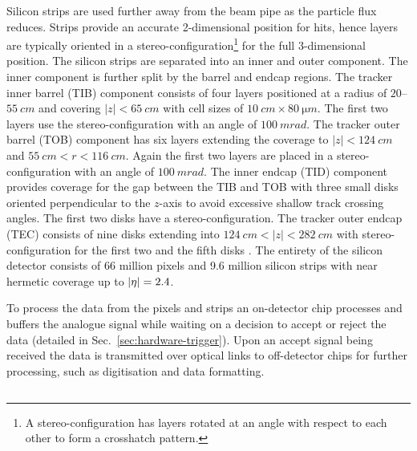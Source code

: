 Silicon strips are used further away from the beam pipe as the particle flux reduces. Strips provide an accurate 2-dimensional position for hits, hence layers are typically oriented in a stereo-configuration\footnote{A stereo-configuration has layers rotated at an angle with respect to each other to form a crosshatch pattern.} for the full 3-dimensional position. The silicon strips are separated into an inner and outer component. The inner component is further split by the barrel and endcap regions. The tracker inner barrel (TIB) component consists of four layers positioned at a radius of $20$--${\SI{55}{cm}}$ and covering ${|z|<\SI{65}{cm}}$ with cell sizes of ${\SI{10}{cm}\times\SI{80}{\micro m}}$. The first two layers use the stereo-configuration with an angle of ${\SI{100}{mrad}}$. The tracker outer barrel (TOB) component has six layers extending the coverage to ${|z|<\SI{124}{cm}}$ and ${\SI{55}{cm}<r<\SI{116}{cm}}$. Again the first two layers are placed in a stereo-configuration with an angle of ${\SI{100}{mrad}}$. The inner endcap (TID) component provides coverage for the gap between the TIB and TOB with three small disks oriented perpendicular to the $z$-axis to avoid excessive shallow track crossing angles. The first two disks have a stereo-configuration. The tracker outer endcap (TEC) consists of nine disks extending into ${\SI{124}{cm}<|z|<\SI{282}{cm}}$ with stereo-configuration for the first two  and the fifth disks \cite{Borrello:687861}. The entirety of the silicon detector consists of 66 million pixels and 9.6 million silicon strips with near hermetic coverage up to $|\eta|=2.4$.

To process the data from the pixels and strips an on-detector chip processes and buffers the analogue signal while waiting on a decision to accept or reject the data (detailed in Sec.~\ref{sec:hardware-trigger}). Upon an accept signal being received the data is transmitted over optical links to off-detector chips for further processing, such as digitisation and data formatting.


\subsection{\ECAL}

